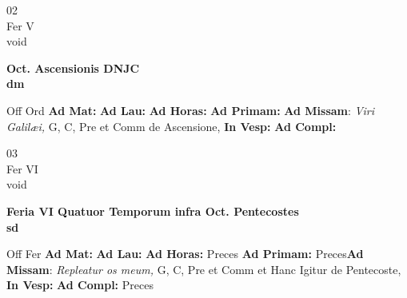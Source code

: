 \documentclass[10pt, openany]{book}
\begin{document}
    \begin{center}
        \begin{minipage}{3.5in}
            \vspace{2em}
            \begin{minipage}{0.5in}
                {\Huge 02} \\
                {\normalsize Fer V} \\
                {\normalsize void}
            \end{minipage}
            \begin{minipage}{3.0in}
                \textbf{ \large Oct. Ascensionis DNJC \\
                \textnormal{\normalsize dm}} \\ 
            \end{minipage}
            \begin{justify}Off Ord
                \textbf{Ad Mat: }
                \textbf{Ad Lau: }
                \textbf{Ad Horas: }
                \textbf{Ad Primam: }\textbf{Ad Missam}: \textit{Viri Galilæi,} G, C, Pre et Comm de Ascensione,  
                \textbf{In Vesp: }
                \textbf{Ad Compl: }
            \end{justify}
        \end{minipage}
    \end{center}

    \begin{center}
        \begin{minipage}{3.5in}
            \vspace{2em}
            \begin{minipage}{0.5in}
                {\Huge 03} \\
                {\normalsize Fer VI} \\
                {\normalsize void}
            \end{minipage}
            \begin{minipage}{3.0in}
                \textbf{ \large Feria VI Quatuor Temporum infra Oct. Pentecostes \\
                \textnormal{\normalsize sd}} \\ 
            \end{minipage}
            \begin{justify}Off Fer
                \textbf{Ad Mat: }
                \textbf{Ad Lau: }
                \textbf{Ad Horas: }Preces
                \textbf{Ad Primam: }Preces\textbf{Ad Missam}: \textit{Repleatur os meum,} G, C, Pre et Comm et Hanc Igitur de Pentecoste,  
                \textbf{In Vesp: }
                \textbf{Ad Compl: }Preces
            \end{justify}
        \end{minipage}
    \end{center}
\end{document}
